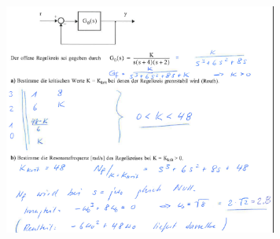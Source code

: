 \begin{multicols}{2}
\includegraphics[width=9cm]{./images/beispiele/beispiel16.png}
\end{multicols}


